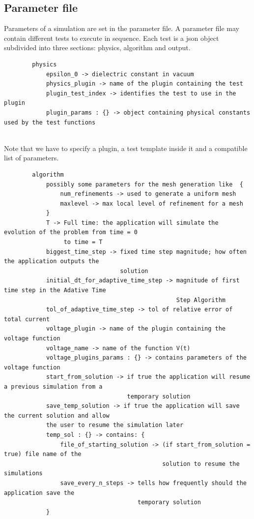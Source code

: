 \documentclass[11pt,a4paper]{article}
\begin{document}
\subsection{Parameter file}
Parameters of a simulation are set in the parameter file. A parameter file may contain different tests to execute in sequence. Each test is a json object subdivided into three sections: physics, algorithm and output.\\
\begin{minipage}{\textwidth}
	\vspace{3mm}
	\small
	\begin{verbatim}
		physics
		    epsilon_0 -> dielectric constant in vacuum
		    physics_plugin -> name of the plugin containing the test
		    plugin_test_index -> identifies the test to use in the plugin
		    plugin_params : {} -> object containing physical constants used by the test functions
	\end{verbatim}
	\vspace*{0mm}
\end{minipage}\\
Note that we have to specify a plugin, a test template inside it and a compatible list of parameters.\\
\begin{minipage}{\textwidth}
	\vspace{3mm}
	\small
	\begin{verbatim}
		algorithm
		    possibly some parameters for the mesh generation like  {
		        num_refinements -> used to generate a uniform mesh
			    maxlevel -> max local level of refinement for a mesh
		    }
		    T -> Full time: the application will simulate the evolution of the problem from time = 0
		         to time = T
		    biggest_time_step -> fixed time step magnitude; how often the application outputs the
		                         solution
		    initial_dt_for_adaptive_time_step -> magnitude of first time step in the Adative Time
		                                         Step Algorithm
		    tol_of_adaptive_time_step -> tol of relative error of total current
		    voltage_plugin -> name of the plugin containing the voltage function
		    voltage_name -> name of the function V(t)
		    voltage_plugins_params : {} -> contains parameters of the voltage function
		    start_from_solution -> if true the application will resume a previous simulation from a
		                           temporary solution
		    save_temp_solution -> if true the application will save the current solution and allow
		    the user to resume the simulation later
		    temp_sol : {} -> contains: {
		        file_of_starting_solution -> (if start_from_solution = true) file name of the
		                                     solution to resume the simulations
		        save_every_n_steps -> tells how frequently should the application save the
		                              temporary solution
		    }
	\end{verbatim}
\end{minipage}\\
\end{document}
